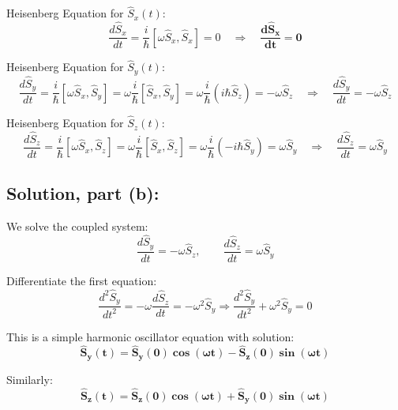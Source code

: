 \documentclass[12pt]{article}
\begin{document}
        Heisenberg Equation for \( \hat{S}_x(t) \):
        \[
            \frac{d\hat{S}_x}{dt} = \frac{i}{\hbar} [\omega \hat{S}_x, \hat{S}_x] = 0
            \quad \Rightarrow \quad
            \boldsymbol{\boxed{ \frac{d\hat{S}_x}{dt}=0 }}
        \]
        
        Heisenberg Equation for \( \hat{S}_y(t) \):
        \[
            \frac{d\hat{S}_y}{dt} = \frac{i}{\hbar} [\omega \hat{S}_x, \hat{S}_y] = \omega \frac{i}{\hbar} [\hat{S}_x, \hat{S}_y] 
            = \omega \frac{i}{\hbar}(i\hbar \hat{S}_z) = -\omega \hat{S}_z
            \quad \Rightarrow \quad
            \boxed{ \frac{d\hat{S}_y}{dt} = -\omega \hat{S}_z }
        \]
        
        Heisenberg Equation for \( \hat{S}_z(t) \):
        \[
            \frac{d\hat{S}_z}{dt} = \frac{i}{\hbar} [\omega \hat{S}_x, \hat{S}_z] = \omega \frac{i}{\hbar} [\hat{S}_x, \hat{S}_z]
            = \omega \frac{i}{\hbar}(-i\hbar \hat{S}_y) = \omega \hat{S}_y
            \quad \Rightarrow \quad
            \boxed{ \frac{d\hat{S}_z}{dt} = \omega \hat{S}_y }
        \]

    \subsection{Solution, part (b):}
        We solve the coupled system:
        \[
            \frac{d\hat{S}_y}{dt} = -\omega \hat{S}_z, \qquad \frac{d\hat{S}_z}{dt} = \omega \hat{S}_y
        \]
        
        Differentiate the first equation:
        \[
            \frac{d^2 \hat{S}_y}{dt^2} = -\omega \frac{d\hat{S}_z}{dt} = -\omega^2 \hat{S}_y
            \Rightarrow \frac{d^2 \hat{S}_y}{dt^2} + \omega^2 \hat{S}_y = 0
        \]
        
        This is a simple harmonic oscillator equation with solution:
        \[
            \boldsymbol{\boxed{\hat{S}_y(t) = \hat{S}_y(0) \cos(\omega t) - \hat{S}_z(0) \sin(\omega t)}}
        \]
        
        Similarly:
        \[
            \boldsymbol{\boxed{\hat{S}_z(t) = \hat{S}_z(0) \cos(\omega t) + \hat{S}_y(0) \sin(\omega t)}}
        \]
\end{document}
